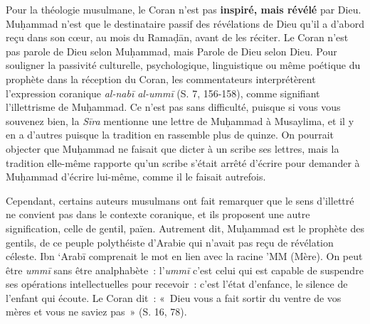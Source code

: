 Pour la théologie musulmane, le Coran n'est pas \textbf{inspiré, mais
révélé} par Dieu. Muḥammad n'est que le destinataire passif des
révélations de Dieu qu'il a d'abord reçu dans son cœur, au mois du
Ramaḍān, avant de les réciter. Le Coran n'est pas parole de Dieu selon
Muḥammad, mais Parole de Dieu selon Dieu. Pour souligner la passivité
culturelle, psychologique, linguistique ou même poétique du prophète
dans la réception du Coran, les commentateurs interprétèrent
l'expression coranique \emph{al-nabī al-ummī} (S. 7, 156-158), comme
signifiant l'illettrisme de Muḥammad. Ce n'est pas sans difficulté,
puisque si vous vous souvenez bien, la \emph{Sīra} mentionne une lettre
de Muḥammad à Musaylima, et il y en a d'autres puisque la tradition en
rassemble plus de quinze. On pourrait objecter que Muḥammad ne faisait
que dicter à un scribe ses lettres, mais la tradition elle-même rapporte
qu'un scribe s'était arrêté d'écrire pour demander à Muḥammad d'écrire
lui-même, comme il le faisait autrefois.

Cependant, certains auteurs musulmans ont fait remarquer que le sens
d'illettré ne convient pas dans le contexte coranique, et ils proposent
une autre signification, celle de gentil, païen. Autrement dit, Muḥammad
est le prophète des gentils, de ce peuple polythéiste d'Arabie qui
n'avait pas reçu de révélation céleste. Ibn `Arabī comprenait le mot en
lien avec la racine 'MM (Mère). On peut être \emph{ummī} sans être
analphabète~: l'\emph{ummī} c'est celui qui est capable de suspendre ses
opérations intellectuelles pour recevoir~: c'est l'état d'enfance, le
silence de l'enfant qui écoute. Le Coran dit~: «~Dieu vous a fait sortir
du ventre de vos mères et vous ne saviez pas~» (S. 16, 78).


